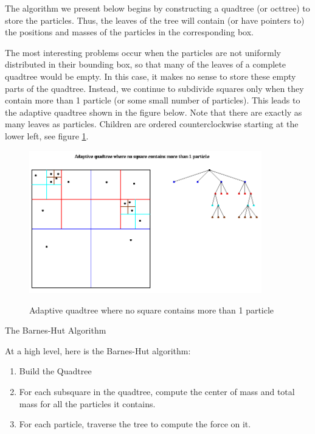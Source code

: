 The algorithm we present below begins by constructing a quadtree (or octtree) to
store the particles. Thus, the leaves of the tree will contain (or have pointers
to) the positions and masses of the particles in the corresponding box.

The most interesting problems occur when the particles are not uniformly
distributed in their bounding box, so that many of the leaves of a complete
quadtree would be empty. In this case, it makes no sense to store these empty
parts of the quadtree. Instead, we continue to subdivide squares only when they
contain more than 1 particle (or some small number of particles). This leads to
the adaptive quadtree shown in the figure below. Note that there are exactly as
many leaves as particles. Children are ordered counterclockwise starting at the
lower left, see figure \ref{fig:bh-Quadtree2}.
 
\begin{figure}[!htbp]
  \centering
  \includegraphics[width=0.9\textwidth]{graphics/bh/Quadtree2.png}
  \label{fig:bh-Quadtree2}
  \caption{Adaptive quadtree where no square contains more than 1 particle}
\end{figure}

 {The Barnes-Hut Algorithm}
\label{sec:bh-barnes-hut}

At a high level, here is the Barnes-Hut algorithm:

\begin{enumerate}
\item  Build the Quadtree
\item  For each subsquare in the quadtree, compute the center of mass and total
mass for all the particles it contains. 
\item  For each particle, traverse the tree to compute the force on it.
\end{enumerate}

